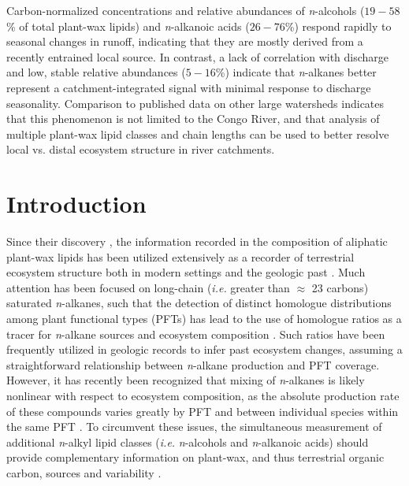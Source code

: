 Carbon-normalized concentrations and relative abundances of \textit{n}-alcohols ($19 - 58$\% of total plant-wax lipids) and \textit{n}-alkanoic acids ($26 - 76$\%) respond rapidly to seasonal changes in runoff, indicating that they are mostly derived from a recently entrained local source. In contrast, a lack of correlation with discharge and low, stable relative abundances ($5 - 16$\%) indicate that \textit{n}-alkanes better represent a catchment-integrated signal with minimal response to discharge seasonality. Comparison to published data on other large watersheds indicates that this phenomenon is not limited to the Congo River, and that analysis of multiple plant-wax lipid classes and chain lengths can be used to better resolve local vs. distal ecosystem structure in river catchments.

\section{Introduction}

Since their discovery \citep{Eglinton:1962uj,Eglinton:1967uz}, the information recorded in the composition of aliphatic plant-wax lipids has been utilized extensively as a recorder of terrestrial ecosystem structure both in modern settings \citep{Diefendorf:2011hg,Bush:2013ie} and the geologic past \citep[see][for review]{Pancost:2004ij,Eglinton:2008hs,Freeman:2014gi}. Much attention has been focused on long-chain (\textit{i.e.} greater than $\approx$ 23 carbons) saturated \textit{n}-alkanes, such that the detection of distinct homologue distributions among plant functional types (PFTs) has lead to the use of homologue ratios as a tracer for \textit{n}-alkane sources and ecosystem composition \citep{Ficken:2000wq,Pancost:2002un,Bingham:2010jt}. Such ratios have been frequently utilized in geologic records to infer past ecosystem changes, assuming a straightforward relationship between \textit{n}-alkane production and PFT coverage. However, it has recently been recognized that mixing of \textit{n}-alkanes is likely nonlinear with respect to ecosystem composition, as the absolute production rate of these compounds varies greatly by PFT and between individual species within the same PFT \citep{Rommerskirchen:2006gr,Vogts:2009fb,Diefendorf:2011hg,Bush:2013ie,Magill:2013ab,Garcin:2014hg}. To circumvent these issues, the simultaneous measurement of additional \textit{n}-alkyl lipid classes (\textit{i.e.} \textit{n}-alcohols and \textit{n}-alkanoic acids) should provide complementary information on plant-wax, and thus terrestrial organic carbon, sources and variability \citep[\textit{e.g.}][]{Chikaraishi:2006gb,Jansen:2006bn,Diefendorf:2011hg,Galy:2011ix,Tao:2015bq}.

